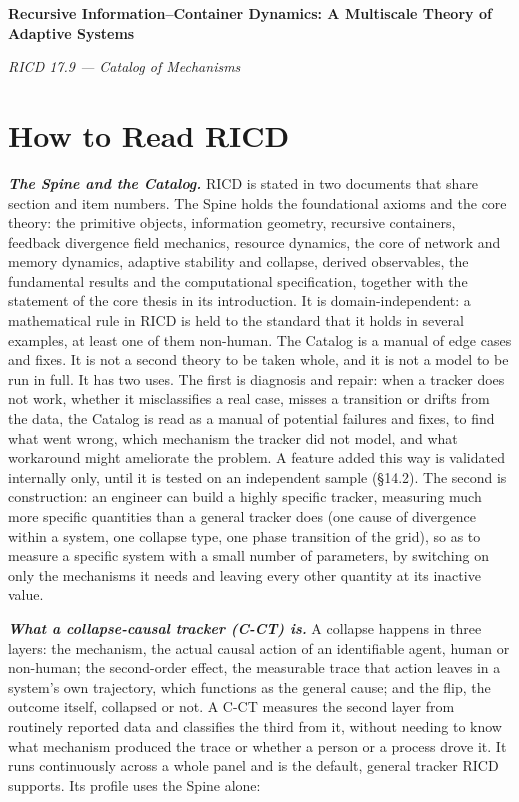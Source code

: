 \documentclass[
]{article}
\author{}
\date{}
\begin{document}
\textbf{Recursive Information--Container Dynamics: A Multiscale Theory
of Adaptive Systems}

\emph{RICD 17.9 --- Catalog of Mechanisms}

\hypertarget{how-to-read-ricd}{%
\section{How to Read RICD}\label{how-to-read-ricd}}

\emph{\textbf{The Spine and the Catalog.}} RICD is stated in two
documents that share section and item numbers. The Spine holds the
foundational axioms and the core theory: the primitive objects,
information geometry, recursive containers, feedback divergence field
mechanics, resource dynamics, the core of network and memory dynamics,
adaptive stability and collapse, derived observables, the fundamental
results and the computational specification, together with the statement
of the core thesis in its introduction. It is domain-independent: a
mathematical rule in RICD is held to the standard that it holds in
several examples, at least one of them non-human. The Catalog is a
manual of edge cases and fixes. It is not a second theory to be taken
whole, and it is not a model to be run in full. It has two uses. The
first is diagnosis and repair: when a tracker does not work, whether it
misclassifies a real case, misses a transition or drifts from the data,
the Catalog is read as a manual of potential failures and fixes, to find
what went wrong, which mechanism the tracker did not model, and what
workaround might ameliorate the problem. A feature added this way is
validated internally only, until it is tested on an independent sample
(§14.2). The second is construction: an engineer can build a highly
specific tracker, measuring much more specific quantities than a general
tracker does (one cause of divergence within a system, one collapse
type, one phase transition of the grid), so as to measure a specific
system with a small number of parameters, by switching on only the
mechanisms it needs and leaving every other quantity at its inactive
value.

\emph{\textbf{What a collapse-causal tracker (C-CT) is.}} A collapse
happens in three layers: the mechanism, the actual causal action of an
identifiable agent, human or non-human; the second-order effect, the
measurable trace that action leaves in a system's own trajectory, which
functions as the general cause; and the flip, the outcome itself,
collapsed or not. A C-CT measures the second layer from routinely
reported data and classifies the third from it, without needing to know
what mechanism produced the trace or whether a person or a process drove
it. It runs continuously across a whole panel and is the default,
general tracker RICD supports. Its profile uses the Spine alone:
\end{document}
